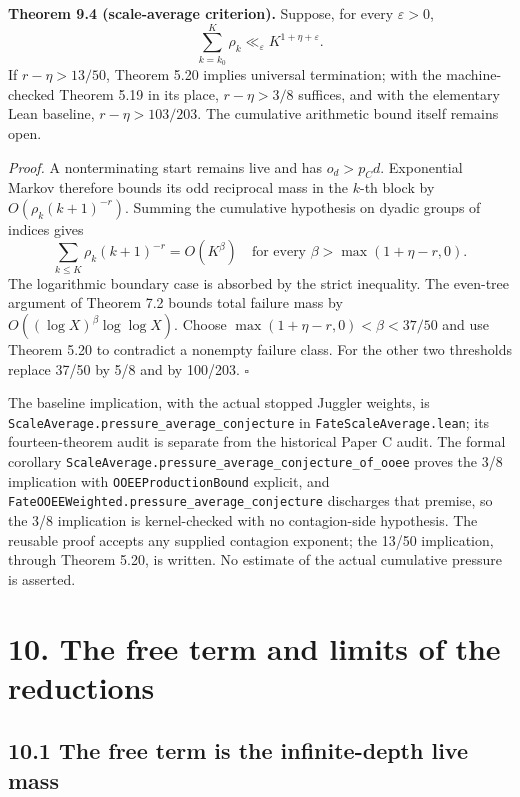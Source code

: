 \documentclass[11pt,a4paper]{article}
\begin{document}
\textbf{Theorem 9.4 (scale-average criterion).} Suppose, for every
\(\varepsilon>0\), \[
\sum_{k=k_0}^{K}\rho_k\ll_\varepsilon K^{1+\eta+\varepsilon}.
\] If \(r-\eta>13/50\), Theorem 5.20 implies universal termination; with
the machine-checked Theorem 5.19 in its place, \(r-\eta>3/8\) suffices,
and with the elementary Lean baseline, \(r-\eta>103/203\). The
cumulative arithmetic bound itself remains open.

\emph{Proof.} A nonterminating start remains live and has \(o_d>p_Cd\).
Exponential Markov therefore bounds its odd reciprocal mass in the
\(k\)-th block by \(O(\rho_k(k+1)^{-r})\). Summing the cumulative
hypothesis on dyadic groups of indices gives \[
\sum_{k\le K}\rho_k(k+1)^{-r}=O(K^\beta)
\quad\text{for every }\beta>\max(1+\eta-r,0).
\] The logarithmic boundary case is absorbed by the strict inequality.
The even-tree argument of Theorem 7.2 bounds total failure mass by
\(O((\log X)^\beta\log\log X)\). Choose \(\max(1+\eta-r,0)<\beta<37/50\)
and use Theorem 5.20 to contradict a nonempty failure class. For the
other two thresholds replace 37/50 by 5/8 and by 100/203. \(\square\)

The baseline implication, with the actual stopped Juggler weights, is
\texttt{\nolinkurl{ScaleAverage.pressure_average_conjecture}} in
\texttt{\nolinkurl{FateScaleAverage.lean}}; its fourteen-theorem audit
is separate from the historical Paper C audit. The formal corollary
\texttt{\nolinkurl{ScaleAverage.pressure_average_conjecture_of_ooee}}
proves the 3/8 implication with \texttt{\nolinkurl{OOEEProductionBound}}
explicit, and
\texttt{\nolinkurl{FateOOEEWeighted.pressure_average_conjecture}}
discharges that premise, so the 3/8 implication is kernel-checked with
no contagion-side hypothesis. The reusable proof accepts any supplied
contagion exponent; the 13/50 implication, through Theorem 5.20, is
written. No estimate of the actual cumulative pressure is asserted.

\section{10. The free term and limits of the
reductions}\label{the-free-term-and-limits-of-the-reductions}

\subsection{10.1 The free term is the infinite-depth live
mass}\label{the-free-term-is-the-infinite-depth-live-mass}
\end{document}
